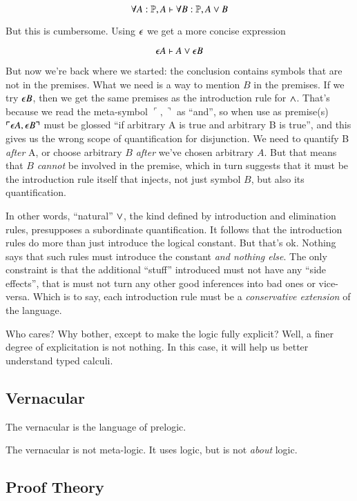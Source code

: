 \documentclass{article}
\begin{document}
\[\forall A:\mathbb{P}, A\vdash\forall B:\mathbb{P}, A\lor B\]

But this is cumbersome.  Using \(\epsilon\) we get a more concise expression

\[\epsilon A\vdash A\lor \epsilon B\]

But now we're back where we started: the conclusion contains symbols
that are not in the premises. What we need is a way to mention \(B\)
in the premises. If we try \(\epsilon B\), then we get the same
premises as the introduction rule for \(\land\). That's because we
read the meta-symbol \(\ulcorner ,\urcorner\) as ``and'', so when use
as premise(s) \(\ulcorner\epsilon A,\epsilon B\urcorner\) must be
glossed ``if arbitrary A is true and arbitrary B is true'', and this
gives us the wrong scope of quantification for disjunction. We need to
quantify B \textit{after} A, or choose arbitrary \(B\) \textit{after}
we've chosen arbitrary \(A\). But that means that \(B\)
\textit{cannot} be involved in the premise, which in turn suggests
that it must be the introduction rule itself that injects, not just
symbol \(B\), but also its quantification.

In other words, ``natural'' \(\lor\), the kind defined by
introduction and elimination rules, presupposes a subordinate
quantification. It follows that the introduction rules do more than
just introduce the logical constant. But that's ok. Nothing says that
such rules must introduce the constant \textit{and nothing else}. The
only constraint is that the additional ``stuff'' introduced must not
have any ``side effects'', that is must not turn any other good
inferences into bad ones or vice-versa. Which is to say, each
introduction rule must be a \textit{conservative extension} of the
language.

Who cares? Why bother, except to make the logic fully explicit? Well,
a finer degree of explicitation is not nothing. In this case, it will
help us better understand typed calculi.

\subsection{Vernacular}

The vernacular is the language of prelogic.

The vernacular is not meta-logic. It uses logic, but is not
\textit{about} logic.

\subsection{Proof Theory}
\end{document}
